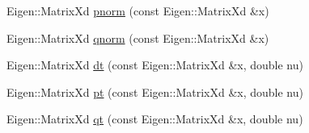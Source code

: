 \begin{DoxyCompactItemize}
Eigen\+::\+Matrix\+Xd \hyperlink{namespacevinecopulib_1_1tools__stats_aa380a12540c4749e14049cdd0b163352}{pnorm} (const Eigen\+::\+Matrix\+Xd \&x)
\item 
Eigen\+::\+Matrix\+Xd \hyperlink{namespacevinecopulib_1_1tools__stats_a4772a68417aa49b50e69c957db8533f7}{qnorm} (const Eigen\+::\+Matrix\+Xd \&x)
\item 
Eigen\+::\+Matrix\+Xd \hyperlink{namespacevinecopulib_1_1tools__stats_abc09bc02add2d7b7781aa42a406be7d9}{dt} (const Eigen\+::\+Matrix\+Xd \&x, double nu)
\item 
Eigen\+::\+Matrix\+Xd \hyperlink{namespacevinecopulib_1_1tools__stats_a1f65dc25a8284fe4629f092969e2861a}{pt} (const Eigen\+::\+Matrix\+Xd \&x, double nu)
\item 
Eigen\+::\+Matrix\+Xd \hyperlink{namespacevinecopulib_1_1tools__stats_a17eb427c3a562c72d2e87438da1cd279}{qt} (const Eigen\+::\+Matrix\+Xd \&x, double nu)
\end{DoxyCompactItemize}

